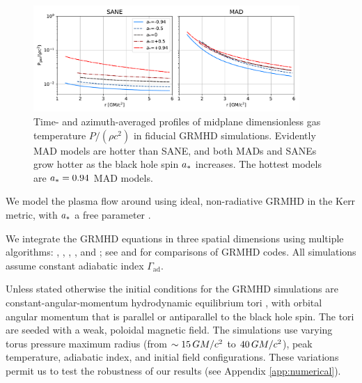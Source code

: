 \begin{figure}
  \centering
  \includegraphics[width=0.9\textwidth]{figures/grmhd_temp.pdf}
  \caption{Time- and azimuth-averaged profiles of midplane dimensionless gas temperature $P/(\rho c^2)$ in \kharma fiducial GRMHD simulations.
    Evidently MAD models are hotter than SANE, and both MADs and SANEs grow hotter as the black hole spin $a_*$ increases.
    The hottest models are $a_* = 0.94$ MAD models.}
  \label{fig:grmhd_temp}
\end{figure}

We model the plasma flow around \sgra using ideal, non-radiative GRMHD in the Kerr metric, 
with $a_*$ a free parameter \citep[see e.g.,][]{1999ApJ...522..727K,2003ApJ...589..444G, 2003ApJ...589..458D, 2005ApJ...635..723A, 2007A&A...473...11D}.

We integrate the GRMHD equations in three spatial dimensions using multiple algorithms:
\kharma   \citep{2021JOSS....6.3336P},
\bhac     \citep{2017ComAC...4....1P},
\hamr     \citep{Liska2019},
\koral    \citep{2013MNRAS.429.3533S}, and
\athenapp \citep{2016ApJS..225...22W};
see \citet{2019ApJS..243...26P} and \citet{Olivares_et_al} for comparisons of GRMHD codes.
All simulations assume constant adiabatic index  $\Gamma_\mathrm{ad}$.

Unless stated otherwise the initial conditions for the GRMHD simulations are constant-angular-momentum hydrodynamic equilibrium tori \citep{1976ApJ...207..962F}, with orbital angular momentum that is parallel or antiparallel to the black hole spin.
The tori are seeded with a weak, poloidal magnetic field.  The simulations use varying torus pressure maximum radius 
(from $\sim 15\,GM/c^2$ to $40\,GM/c^2$), peak temperature, adiabatic index, and initial field configurations.  These variations permit us to test the robustness of our results (see Appendix \ref{app:numerical}).  

